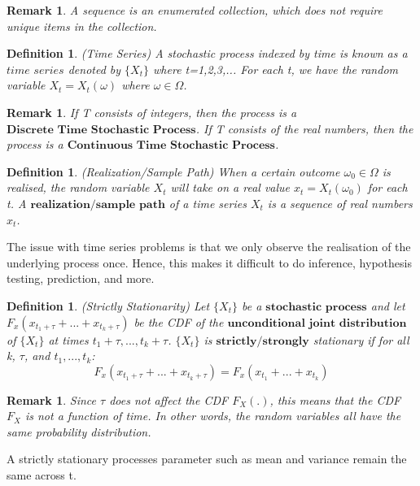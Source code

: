 \documentclass[twoside]{article}
\newtheorem{remark}[theorem]{Remark}
\newtheorem{definition}[theorem]{Definition}
\begin{document}
\begin{remark}
A sequence is an enumerated collection, which does not require unique items in the collection.
\end{remark}

\begin{definition}
(Time Series) A stochastic process indexed by time is known as a $\textit{time series}$ denoted by $\{X_t\}$ where t=1,2,3,... For each t, we have the random variable $X_t = X_t(\omega)$ where $\omega \in \Omega$. 
\end{definition}

\begin{remark}
If T consists of integers, then the process is a $\textbf{Discrete Time Stochastic Process}$. If T consists of the real numbers, then the process is a $\textbf{Continuous Time Stochastic Process}$.
\end{remark}

\begin{definition}
(Realization/Sample Path) When a certain outcome $\omega_0 \in \Omega$ is realised, the random variable $X_t$ will take on a real value $x_t = X_t(\omega_0)$ for each t. A $\textbf{realization/sample path}$ of a time series ${X_t}$ is a sequence of real numbers ${x_t}$.
\end{definition}

The issue with time series problems is that we only observe the realisation of the underlying process once. Hence, this makes it difficult to do inference, hypothesis testing, prediction, and more.

\begin{definition}
(Strictly Stationarity) Let $\{X_t\}$ be a $\textbf{stochastic process}$ and let $F_x(x_{t_1 + \tau} + ... + x_{t_k + \tau})$ be the CDF of the $\textbf{unconditional joint distribution}$ of $\{X_t\}$ at times $t_1 + \tau ,..., t_k + \tau$. $\{X_t\}$ is $\textbf{strictly/strongly}$ stationary if for all k, $\tau$, and $t_1,...,t_k$:
$$
F_x(x_{t_1 + \tau} + ... + x_{t_k + \tau}) = F_x(x_{t_1} + ... + x_{t_k})
$$
\end{definition}

\begin{remark}
Since $\tau$ does not affect the CDF $F_X(.)$, this means that the CDF $F_X$ is not a function of time. In other words, the random variables all have the same probability distribution.
\end{remark}

A strictly stationary processes parameter such as mean and variance remain the same across t. 
\end{document}
